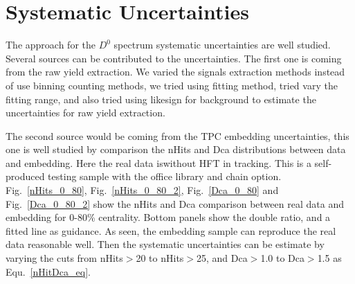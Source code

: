 \clearpage

\section{\label{systematic}Systematic Uncertainties}
%
%

The approach for the $D^0$ spectrum systematic uncertainties are well studied. Several sources can be contributed to the uncertainties. The first one is coming from the raw yield extraction. We varied the signals extraction methods instead of use binning counting methods, we tried using fitting method, tried vary the fitting range, and also tried using likesign for background to estimate the uncertainties for raw yield extraction. 

The second source would be coming from the TPC embedding uncertainties, this one is well studied by comparison the nHits and Dca distributions between data and embedding. Here the real data iswithout HFT in tracking. This is a self-produced testing sample with the office library and chain option. Fig.~\ref{nHits_0_80}, Fig.~\ref{nHits_0_80_2}, Fig.~\ref{Dca_0_80} and Fig.~\ref{Dca_0_80_2} show the nHits and Dca comparison between real data and embedding for 0-80\% centrality. Bottom panels show the double ratio, and a fitted line as guidance. As seen, the embedding sample can reproduce the real data reasonable well. Then the systematic uncertainties can be estimate by varying the cuts from nHits$>$20 to nHits$>$25, and Dca$>$1.0 to Dca$>$1.5 as Equ.~\ref{nHitDca_eq}. 

